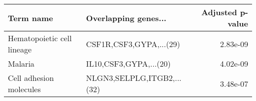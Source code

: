 \begin{tabular}{llr}
\toprule
                 Term name &       Overlapping genes... &  Adjusted p-value \\
\midrule
Hematopoietic cell lineage &    CSF1R,CSF3,GYPA,...(29) &          2.83e-09 \\
                   Malaria &     IL10,CSF3,GYPA,...(20) &          4.02e-09 \\
   Cell adhesion molecules & NLGN3,SELPLG,ITGB2,...(32) &          3.48e-07 \\
\bottomrule
\end{tabular}
